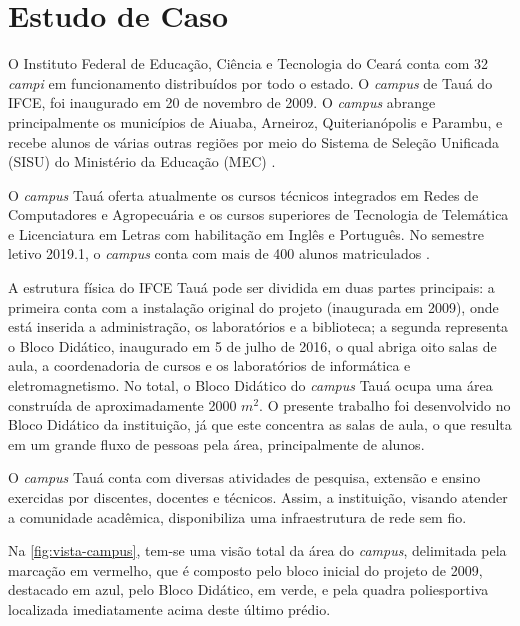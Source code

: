\section{Estudo de Caso}
\label{sec:estudo-de-caso}

O Instituto Federal de Educação, Ciência e Tecnologia do Ceará conta com 32 \textit{campi} em funcionamento distribuídos por todo o estado. O \textit{campus} de Tauá do IFCE, foi inaugurado em 20 de novembro de 2009. O \textit{campus} abrange principalmente os municípios de Aiuaba, Arneiroz, Quiterianópolis e Parambu, e recebe alunos de várias outras regiões por meio do Sistema de Seleção Unificada (SISU) do Ministério da Educação (MEC) \cite{ifceTaua2019}.

O \textit{campus} Tauá oferta atualmente os cursos técnicos integrados em Redes de Computadores e Agropecuária e os cursos superiores de Tecnologia de Telemática e Licenciatura em Letras com habilitação em Inglês e Português. No semestre letivo 2019.1, o \textit{campus} conta com mais de 400 alunos matriculados \cite{ifceTaua2019}.

A estrutura física do IFCE Tauá pode ser dividida em duas partes principais: a primeira conta com a instalação original do projeto (inaugurada em 2009), onde está inserida a administração, os laboratórios e a biblioteca; a segunda representa o Bloco Didático, inaugurado em 5 de julho de 2016, o qual abriga oito salas de aula, a coordenadoria de cursos e os laboratórios de informática e eletromagnetismo. No total, o Bloco Didático do \textit{campus} Tauá ocupa uma área construída de aproximadamente 2000 $m^{2}$. O presente trabalho foi desenvolvido no Bloco Didático da instituição, já que este concentra as salas de aula, o que resulta em um grande fluxo de pessoas pela área, principalmente de alunos.

O \textit{campus} Tauá conta com diversas atividades de pesquisa, extensão e ensino exercidas por discentes, docentes e técnicos. Assim, a instituição, visando atender a comunidade acadêmica, disponibiliza uma infraestrutura de rede sem fio.

Na \autoref{fig:vista-campus}, tem-se uma visão total da área do \textit{campus}, delimitada pela marcação em vermelho, que é composto pelo bloco inicial do projeto de 2009, destacado em azul, pelo Bloco Didático, em verde, e pela quadra poliesportiva localizada imediatamente acima deste último prédio.

